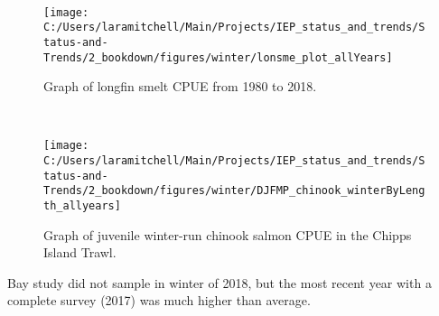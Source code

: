 \documentclass[
]{book}
\begin{document}
\begin{panel-grid}
\begin{columns-nocenter}
\begin{column800}
\begin{expand}
\end{expand}

\end{column800}

\begin{column40}

~

\end{column40}

\begin{column800}

\begin{expand}

\begin{figure}
\texttt{[image: C:/Users/laramitchell/Main/Projects/IEP\_status\_and\_trends/Status-and-Trends/2\_bookdown/figures/winter/lonsme\_plot\_allYears]} \caption{Graph of longfin smelt CPUE from 1980 to 2018. }\label{fig:unnamed-chunk-174}
\end{figure}

\end{expand}

\end{column800}

\begin{column40}

~

\end{column40}

\begin{column800}

\begin{expand}

\begin{figure}
\texttt{[image: C:/Users/laramitchell/Main/Projects/IEP\_status\_and\_trends/Status-and-Trends/2\_bookdown/figures/winter/DJFMP\_chinook\_winterByLength\_allyears]} \caption{Graph of juvenile winter-run chinook salmon CPUE in the Chipps Island Trawl.}\label{fig:unnamed-chunk-175}
\end{figure}

\end{expand}

\end{column800}

\end{columns-nocenter}

\begin{columns-nocenter}

\begin{column800}

Bay study did not sample in winter of 2018, but the most recent year with a complete survey (2017) was much higher than average.


\end{column800}
\end{columns-nocenter}
\end{panel-grid}
\end{document}
